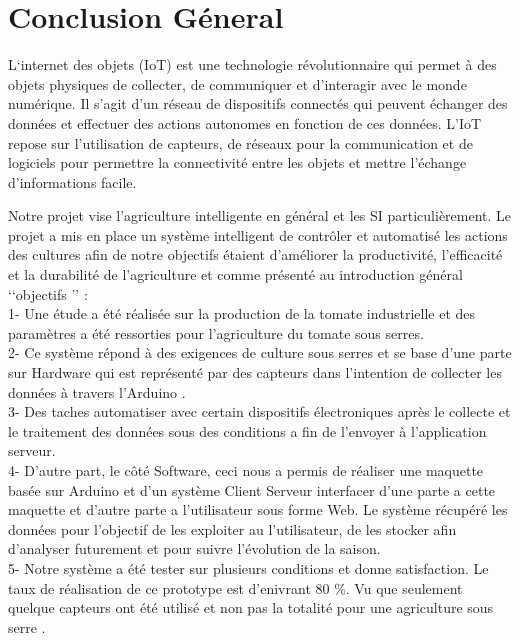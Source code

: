 \chapter{Conclusion Géneral} \label{chap:Conclusion Géneral}
L`internet des objets (IoT) est une technologie révolutionnaire qui permet à des objets physiques de collecter, de communiquer et d'interagir avec le monde numérique. Il s'agit d'un réseau de dispositifs connectés qui peuvent échanger des données et effectuer des actions autonomes en fonction de ces données. L'IoT repose sur l'utilisation de capteurs, de réseaux pour la communication et de logiciels pour permettre la connectivité entre les objets et mettre l'échange d'informations facile.
\newline

Notre projet vise l’agriculture intelligente en général et les SI particulièrement. Le projet a mis en place un système intelligent de contrôler et automatisé les actions des cultures afin de notre objectifs étaient d’améliorer la productivité, l'efficacité et la durabilité de l'agriculture et comme présenté au introduction général ‘‘objectifs ’’ :
\\
1-  Une étude a été réalisée sur la production de la tomate industrielle et des paramètres a été ressorties pour l’agriculture du tomate sous serres.
\\
2-  Ce système répond à des exigences de culture sous serres et se base d’une parte sur Hardware qui est représenté par des capteurs dans l’intention de collecter les données à travers l’Arduino .
\\
3-  Des taches automatiser avec certain dispositifs électroniques après le collecte et le traitement des données sous des conditions a fin de l’envoyer à l’application serveur.
\\
4-  D’autre part, le côté Software, ceci nous a permis de réaliser une maquette basée sur Arduino et d’un système Client Serveur interfacer d’une parte a cette maquette et d’autre parte a l’utilisateur sous forme Web. Le système récupéré les données pour l’objectif de les exploiter au l’utilisateur, de les stocker afin d’analyser futurement et pour suivre l’évolution de la saison. 
\\
5-  Notre système a été tester sur plusieurs conditions et donne satisfaction. Le taux de réalisation de ce prototype est d’enivrant 80 \%. Vu que seulement quelque capteurs ont été utilisé et non pas la totalité pour une agriculture sous serre . 

